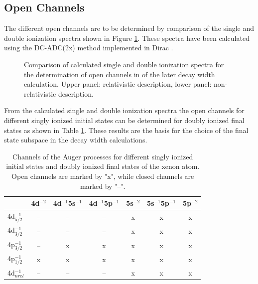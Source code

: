 \subsection{Open Channels}
The different open channels are to be determined by comparison of the single
and double ionization spectra shown in Figure \ref{figure:Xe_sdip}.
These spectra have been calculated using the
DC-ADC(2x) method implemented in Dirac
\cite{Pernpointner04_1,Pernpointner10_1,DIRAC13}.

\begin{figure}[]
  \centering
  
  
  \caption{Comparison of calculated single and double ionization spectra
           for the determination of open channels in of the later decay
           width calculation. Upper panel: relativistic description, lower
           panel: non-relativistic description.
           }
  \label{figure:Xe_sdip}
\end{figure}


From the calculated single and double ionization spectra the open channels
for different singly ionized initial states can be determined for
doubly ionized final states
as shown in Table \ref{table:Xe_open_channels}.
These results are the basis for the choice of the final state subspace
in the decay width calculations.
\begin{table}[h]
  \centering
  \caption{Channels of the Auger processes for different singly ionized
           initial states and doubly ionized final states
           of the xenon atom. Open channels are marked by "x", while closed
           channels are marked by "--".}
  \begin{tabular}{lcccccc}
   \toprule
                   & 4d$^{-2}$ & 4d$^{-1}$5s$^{-1}$ & 4d$^{-1}$5p$^{-1}$ & 5s$^{-2}$ & 5s$^{-1}$5p$^{-1}$ & 5p$^{-2}$ \\
   \midrule
   4d$_{5/2}^{-1}$ &      --   &       --           &        --          &     x     &     x              &     x     \\
   4d$_{3/2}^{-1}$ &      --   &       --           &        --          &     x     &     x              &     x     \\
   4p$_{3/2}^{-1}$ &      --   &        x           &         x          &     x     &     x              &     x     \\
   4p$_{1/2}^{-1}$ &       x   &        x           &         x          &     x     &     x              &     x     \\
   \midrule
   4d$^{-1}_{nrel}$&      --   &       --           &        --          &     x     &     x              &     x     \\
   \bottomrule
  \end{tabular}
  \label{table:Xe_open_channels}
\end{table}




